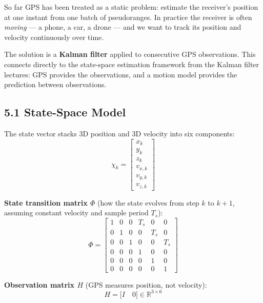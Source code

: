 \documentclass[12pt, a4paper]{article}
\begin{document}
So far GPS has been treated as a static problem: estimate the receiver's
position at one instant from one batch of pseudoranges.
In practice the receiver is often \emph{moving} --- a phone, a car, a drone
--- and we want to track its position and velocity continuously over time.

The solution is a \textbf{Kalman filter} applied to consecutive GPS
observations.
This connects directly to the state-space estimation framework from the
Kalman filter lectures: GPS provides the observations, and a motion model
provides the prediction between observations.

\subsection*{5.1 \quad State-Space Model}

The state vector stacks 3D position and 3D velocity into six components:
\[
  \chi_k =
  \begin{bmatrix}
    x_k \\ y_k \\ z_k \\ v_{x,k} \\ v_{y,k} \\ v_{z,k}
  \end{bmatrix}
\]

\textbf{State transition matrix $\Phi$} (how the state evolves from step
$k$ to $k+1$, assuming constant velocity and sample period $T_s$):
\[
  \Phi =
  \begin{bmatrix}
    1 & 0 & 0 & T_s & 0   & 0   \\
    0 & 1 & 0 & 0   & T_s & 0   \\
    0 & 0 & 1 & 0   & 0   & T_s \\
    0 & 0 & 0 & 1   & 0   & 0   \\
    0 & 0 & 0 & 0   & 1   & 0   \\
    0 & 0 & 0 & 0   & 0   & 1
  \end{bmatrix}
\]

\textbf{Observation matrix $H$} (GPS measures position, not velocity):
\[
  H = \bigl[I \quad 0\bigr] \in \mathbb{R}^{3\times 6}
\]
\end{document}
